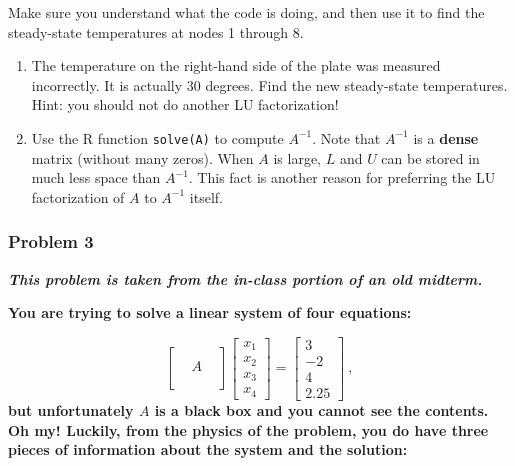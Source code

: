 \documentclass[]{article}
\begin{document}
Make sure you understand what the code is doing, and then use it to find
the steady-state temperatures at nodes 1 through 8.

\begin{enumerate}
\def\labelenumi{\alph{enumi})}
\setcounter{enumi}{3}
\item
  The temperature on the right-hand side of the plate was measured
  incorrectly. It is actually 30 degrees. Find the new steady-state
  temperatures. Hint: you should not do another LU factorization!
\item
  Use the R function \texttt{solve(A)} to compute \(A^{-1}\). Note that
  \(A^{-1}\) is a \textbf{dense} matrix (without many zeros). When \(A\)
  is large, \(L\) and \(U\) can be stored in much less space than
  \(A^{-1}\). This fact is another reason for preferring the LU
  factorization of \(A\) to \(A^{-1}\) itself.
\end{enumerate}

\hypertarget{problem-3}{%
\subsubsection{Problem 3}\label{problem-3}}

\textbf{\emph{This problem is taken from the in-class portion of an old
midterm.}}

\textbf{You are trying to solve a linear system of four equations:}

\[\left[\begin{array}{ccc} && \\ & A &   \\ && \\ && \end{array}\right]
\left[\begin{array}{c}x_1 \\ x_2 \\ x_3 \\ x_4 \end{array}\right]=\left[\begin{array}{c}3 \\ -2 \\ 4 \\ 2.25 \end{array}\right]~,\]
\textbf{but unfortunately \(A\) is a black box and you cannot see the
contents. Oh my! Luckily, from the physics of the problem, you do have
three pieces of information about the system and the solution:}
\end{document}

